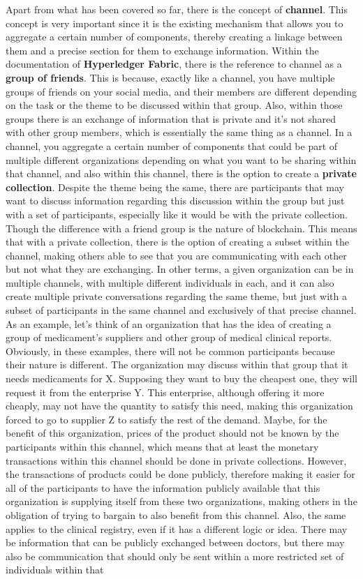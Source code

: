 Apart from what has been covered so far, there is the concept of \textbf{channel}. This concept is very important since it is the existing mechanism that allows you to aggregate a certain number of components, thereby creating a linkage between them and a precise section for them to exchange information. Within the documentation of \textbf{Hyperledger Fabric}, there is the reference to channel as a \textbf{group of friends}. This is because, exactly like a channel, you have multiple groups of friends on your social media, and their members are different depending on the task or the theme to be discussed within that group. Also, within those groups there is an exchange of information that is private and it's not shared with other group members, which is essentially the same thing as a channel. In a channel, you aggregate a certain number of components that could be part of multiple different organizations depending on what you want to be sharing within that channel, and also within this channel, there is the option to create a \textbf{private collection}. Despite the theme being the same, there are participants that may want to discuss information regarding this discussion within the group but just with a set of participants, especially like it would be with the private collection. Though the difference with a friend group is the nature of blockchain. This means that with a private collection, there is the option of creating a subset within the channel, making others able to see that you are communicating with each other but not what they are exchanging. In other terms, a given organization can be in multiple channels, with multiple different individuals in each, and it can also create multiple private conversations regarding the same theme, but just with a subset of participants in the same channel and exclusively of that precise channel. As an example, let's think of an organization that has the idea of creating a group of medicament's suppliers and other group of medical clinical reports. Obviously, in these examples, there will not be common participants because their nature is different. The organization may discuss within that group that it needs medicaments for X. Supposing they want to buy the cheapest one, they will request it from the enterprise Y. This enterprise, although offering it more cheaply, may not have the quantity to satisfy this need, making this organization forced to go to supplier Z to satisfy the rest of the demand. Maybe, for the benefit of this organization, prices of the product should not be known by the participants within this channel, which means that at least the monetary transactions within this channel should be done in private collections. However, the transactions of products could be done publicly, therefore making it easier for all of the participants to have the information publicly available that this organization is supplying itself from these two organizations, making others in the obligation of trying to bargain to also benefit from this channel. Also, the same applies to the clinical registry, even if it has a different logic or idea. There may be information that can be publicly exchanged between doctors, but there may also be communication that should only be sent within a more restricted set of individuals within that 